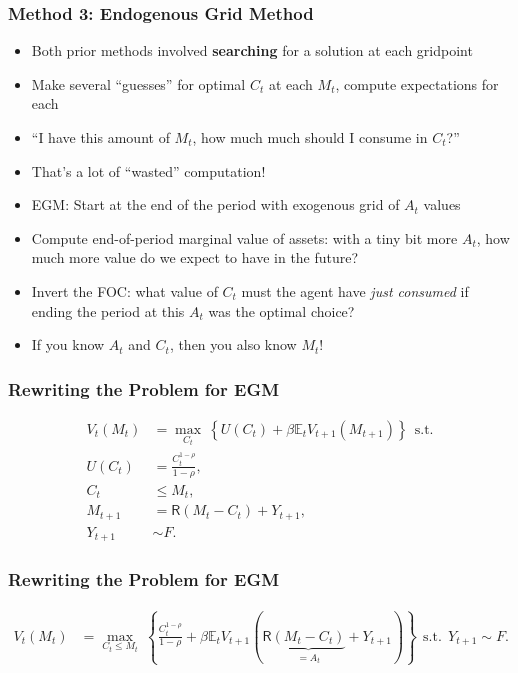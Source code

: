 \documentclass[aspectratio=169]{beamer}
\newcommand{\E}{\mathbb{E}}
\begin{document}
\begin{frame}
\frametitle{Method 3: Endogenous Grid Method}

\begin{itemize}
	\item Both prior methods involved \textbf{searching} for a solution at each gridpoint
	
	\item Make several ``guesses'' for optimal $C_t$ at each $M_t$, compute expectations for each
	
	\item ``I have this amount of $M_t$, how much much should I consume in $C_t$?''
	
	\item That's a lot of ``wasted'' computation!
	
	\item EGM: Start at the end of the period with exogenous grid of $A_t$ values
	
	\item Compute end-of-period marginal value of assets: with a tiny bit more $A_t$, how much more value do we expect to have in the future?
	
	\item Invert the FOC: what value of $C_t$ must the agent have \textit{just consumed} if ending the period at this $A_t$ was the optimal choice?
	
	\item If you know $A_t$ and $C_t$, then you also know $M_t$!
\end{itemize}
\end{frame}


\begin{frame}
\frametitle{Rewriting the Problem for EGM}

\begin{align*}
V_t(M_t) &= \max_{C_t} ~ \left\{ U(C_t) + \beta \E_t V_{t+1}(M_{t+1}) \right\} ~~\text{s.t.} \\
U(C_t) &= \frac{C_t^{1-\rho}}{1-\rho}, \\
C_t &\leq M_t, \\
M_{t+1} &= \mathsf{R} (M_t - C_t) + Y_{t+1}, \\
Y_{t+1} &\sim F.
\end{align*}

\end{frame}


\begin{frame}
\frametitle{Rewriting the Problem for EGM}

\begin{align*}
V_t(M_t) &= \max_{C_t \leq M_t} ~ \left\{ \frac{C_t^{1-\rho}}{1-\rho} + \beta \E_t V_{t+1}(\mathsf{R} \underbrace{(M_t - C_t)}_{=A_t} + Y_{t+1}) \right\} ~~\text{s.t.}~~  Y_{t+1} \sim F.
\end{align*}

\end{frame}
\end{document}
